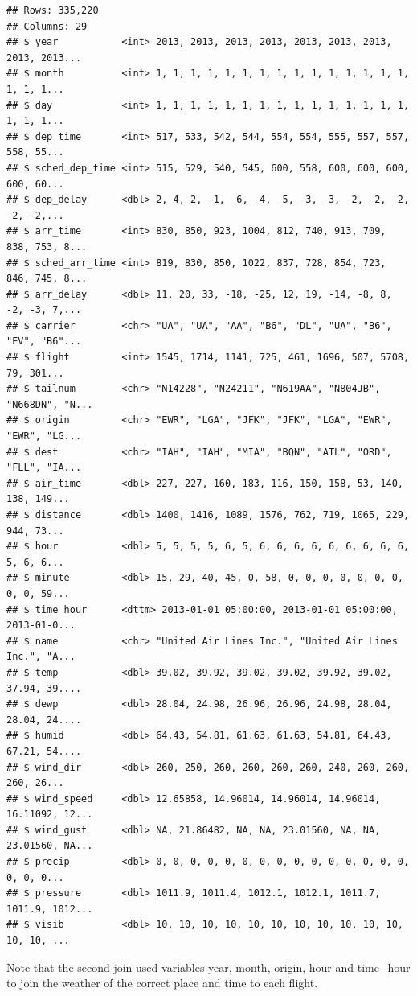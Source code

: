 \documentclass[]{tufte-book}
\begin{document}
\begin{verbatim}
## Rows: 335,220
## Columns: 29
## $ year           <int> 2013, 2013, 2013, 2013, 2013, 2013, 2013, 2013, 2013...
## $ month          <int> 1, 1, 1, 1, 1, 1, 1, 1, 1, 1, 1, 1, 1, 1, 1, 1, 1, 1...
## $ day            <int> 1, 1, 1, 1, 1, 1, 1, 1, 1, 1, 1, 1, 1, 1, 1, 1, 1, 1...
## $ dep_time       <int> 517, 533, 542, 544, 554, 554, 555, 557, 557, 558, 55...
## $ sched_dep_time <int> 515, 529, 540, 545, 600, 558, 600, 600, 600, 600, 60...
## $ dep_delay      <dbl> 2, 4, 2, -1, -6, -4, -5, -3, -3, -2, -2, -2, -2, -2,...
## $ arr_time       <int> 830, 850, 923, 1004, 812, 740, 913, 709, 838, 753, 8...
## $ sched_arr_time <int> 819, 830, 850, 1022, 837, 728, 854, 723, 846, 745, 8...
## $ arr_delay      <dbl> 11, 20, 33, -18, -25, 12, 19, -14, -8, 8, -2, -3, 7,...
## $ carrier        <chr> "UA", "UA", "AA", "B6", "DL", "UA", "B6", "EV", "B6"...
## $ flight         <int> 1545, 1714, 1141, 725, 461, 1696, 507, 5708, 79, 301...
## $ tailnum        <chr> "N14228", "N24211", "N619AA", "N804JB", "N668DN", "N...
## $ origin         <chr> "EWR", "LGA", "JFK", "JFK", "LGA", "EWR", "EWR", "LG...
## $ dest           <chr> "IAH", "IAH", "MIA", "BQN", "ATL", "ORD", "FLL", "IA...
## $ air_time       <dbl> 227, 227, 160, 183, 116, 150, 158, 53, 140, 138, 149...
## $ distance       <dbl> 1400, 1416, 1089, 1576, 762, 719, 1065, 229, 944, 73...
## $ hour           <dbl> 5, 5, 5, 5, 6, 5, 6, 6, 6, 6, 6, 6, 6, 6, 6, 5, 6, 6...
## $ minute         <dbl> 15, 29, 40, 45, 0, 58, 0, 0, 0, 0, 0, 0, 0, 0, 0, 59...
## $ time_hour      <dttm> 2013-01-01 05:00:00, 2013-01-01 05:00:00, 2013-01-0...
## $ name           <chr> "United Air Lines Inc.", "United Air Lines Inc.", "A...
## $ temp           <dbl> 39.02, 39.92, 39.02, 39.02, 39.92, 39.02, 37.94, 39....
## $ dewp           <dbl> 28.04, 24.98, 26.96, 26.96, 24.98, 28.04, 28.04, 24....
## $ humid          <dbl> 64.43, 54.81, 61.63, 61.63, 54.81, 64.43, 67.21, 54....
## $ wind_dir       <dbl> 260, 250, 260, 260, 260, 260, 240, 260, 260, 260, 26...
## $ wind_speed     <dbl> 12.65858, 14.96014, 14.96014, 14.96014, 16.11092, 12...
## $ wind_gust      <dbl> NA, 21.86482, NA, NA, 23.01560, NA, NA, 23.01560, NA...
## $ precip         <dbl> 0, 0, 0, 0, 0, 0, 0, 0, 0, 0, 0, 0, 0, 0, 0, 0, 0, 0...
## $ pressure       <dbl> 1011.9, 1011.4, 1012.1, 1012.1, 1011.7, 1011.9, 1012...
## $ visib          <dbl> 10, 10, 10, 10, 10, 10, 10, 10, 10, 10, 10, 10, 10, ...
\end{verbatim}

Note that the second join used variables year, month, origin, hour and time\_hour to join the weather of the correct place and time to each flight.
\end{document}
